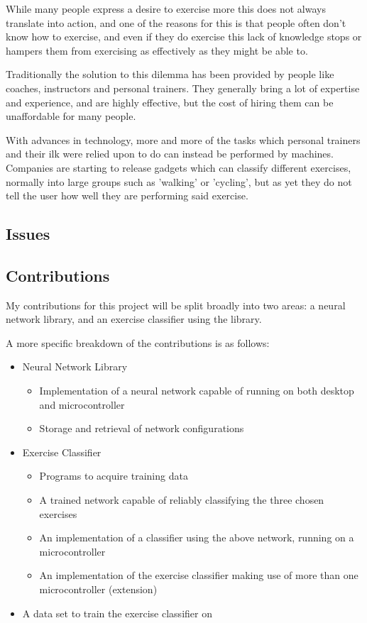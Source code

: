 \documentclass[a4paper]{article}
\begin{document}
While many people express a desire to exercise more this does not always translate into action, and one of the reasons for this is that
people often don't know how to exercise, and even if they do exercise this lack of knowledge stops or hampers them from exercising as effectively as they might be able to.

Traditionally the solution to this dilemma has been provided by people like coaches, instructors and personal trainers. They generally bring a lot of expertise and experience, and are highly effective, but the cost of hiring them can be unaffordable for many people.

With advances in technology, more and more of the tasks which personal trainers and their ilk were relied upon to do can instead be performed by machines. Companies are starting to release gadgets which can classify different exercises, normally into large groups such as 'walking' or 'cycling', but as yet they do not tell the user how well they are performing said exercise.

\subsection{Issues}%


\subsection{Contributions}%

My contributions for this project will be split broadly into two areas: a neural network library, and an exercise classifier using the library.

A more specific breakdown of the contributions is as follows:

\begin{itemize}
\item Neural Network Library 
  \begin{itemize}
  \item Implementation of a neural network capable of running on  both desktop and microcontroller
    \item Storage and retrieval of network configurations
  \end{itemize}
\item Exercise Classifier
  \begin{itemize}
  \item Programs to acquire training data
    \item A trained network capable of reliably classifying the three chosen exercises
    \item An implementation of a classifier using the above network, running on a microcontroller
    \item An implementation of the exercise classifier making use of more than one microcontroller (extension)
  \end{itemize}
\item A data set to train the exercise classifier on
\end{itemize}
\end{document}
